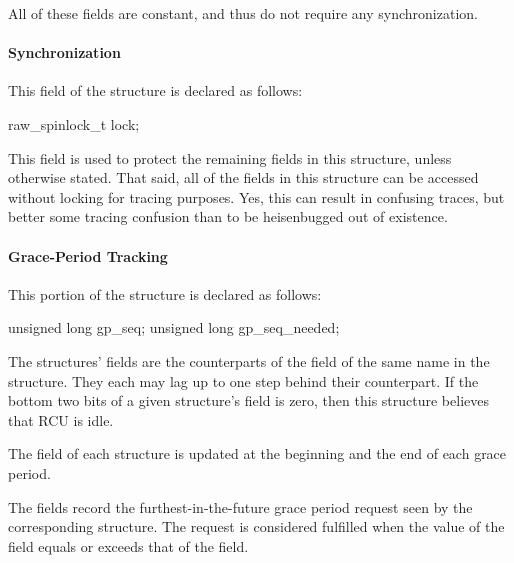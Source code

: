 All of these fields are constant, and thus do not require any
synchronization.

\paragraph{Synchronization}

This field of the  structure is declared as follows:

\begin{VerbatimN}
	raw_spinlock_t lock;
\end{VerbatimN}

This field is used to protect the remaining fields in this structure,
unless otherwise stated.
That said, all of the fields in this structure
can be accessed without locking for tracing purposes.
Yes, this can
result in confusing traces, but better some tracing confusion than to be
heisenbugged out of existence.


\paragraph{Grace-Period Tracking}

This portion of the  structure is declared as follows:

\begin{VerbatimN}
	unsigned long gp_seq;
	unsigned long gp_seq_needed;
\end{VerbatimN}

The  structures'  fields are the counterparts of
the field of the same name in the  structure.
They each may
lag up to one step behind their  counterpart.
If the bottom
two bits of a given  structure's  field is zero,
then this  structure believes that RCU is idle.

The  field of each  structure is updated at the
beginning and the end of each grace period.

The  fields record the furthest-in-the-future grace
period request seen by the corresponding  structure.
The
request is considered fulfilled when the value of the  field
equals or exceeds that of the  field.

\QuickQuizEnd

